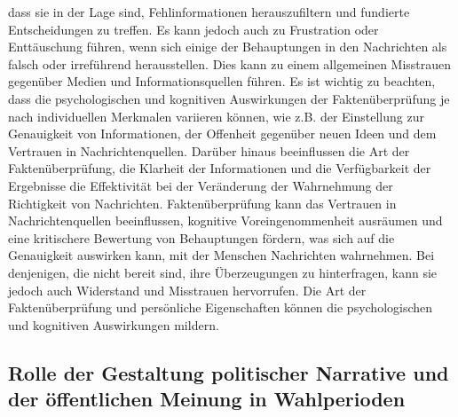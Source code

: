 \documentclass[a4paper,listof=totoc,bibliography=totoc]{scrartcl}
\begin{document}
dass sie in der Lage sind, Fehlinformationen herauszufiltern und fundierte Entscheidungen zu treffen. Es kann jedoch auch zu Frustration oder Enttäuschung führen, wenn sich einige 
der Behauptungen in den Nachrichten als falsch oder irreführend herausstellen. Dies kann zu einem allgemeinen Misstrauen gegenüber Medien und Informationsquellen führen. 
Es ist wichtig zu beachten, dass die psychologischen und kognitiven Auswirkungen der Faktenüberprüfung je nach individuellen Merkmalen variieren können, wie z.B. der 
Einstellung zur Genauigkeit von Informationen, der Offenheit gegenüber neuen Ideen und dem Vertrauen in Nachrichtenquellen. Darüber hinaus beeinflussen die Art der Faktenüberprüfung, 
die Klarheit der Informationen und die Verfügbarkeit der Ergebnisse die Effektivität bei der Veränderung der Wahrnehmung der Richtigkeit von Nachrichten. 
Faktenüberprüfung kann das Vertrauen in Nachrichtenquellen beeinflussen, kognitive Voreingenommenheit ausräumen und eine kritischere Bewertung von Behauptungen fördern, 
was sich auf die Genauigkeit auswirken kann, mit der Menschen Nachrichten wahrnehmen. Bei denjenigen, die nicht bereit sind, ihre Überzeugungen zu hinterfragen, kann sie 
jedoch auch Widerstand und Misstrauen hervorrufen. Die Art der Faktenüberprüfung und persönliche Eigenschaften können die psychologischen und kognitiven Auswirkungen mildern.

\subsection{Rolle der Gestaltung politischer Narrative und der öffentlichen Meinung in Wahlperioden}
\end{document}
